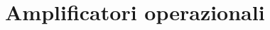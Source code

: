 \documentclass[../main.tex]{subfiles}
\begin{document}
\clearpage
\thispagestyle{empty}
\vspace*{7cm}
\section{Amplificatori operazionali}
\vspace*{1.5cm}
\end{document}
